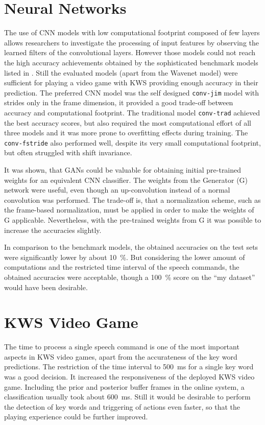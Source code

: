\section{Neural Networks}
The use of CNN models with low computational footprint composed of few layers allows researchers to investigate the processing of input features by observing the learned filters of the convolutional layers.
However those models could not reach the high accuracy achievements obtained by the sophisticated benchmark models listed in .
Still the evaluated models (apart from the Wavenet model) were sufficient for playing a video game with KWS providing enough accuracy in their prediction.
The preferred CNN model was the self designed \texttt{conv-jim} model with strides only in the frame dimension, it provided a good trade-off between accuracy and computational footprint.
The traditional model \texttt{conv-trad} achieved the best accuracy scores, but also required the most computational effort of all three models and it was more prone to overfitting effects during training.
The \texttt{conv-fstride} also performed well, despite its very small computational footprint, but often struggled with shift invariance.

It was shown, that GANs could be valuable for obtaining initial pre-trained weights for an equivalent CNN classifier.
The weights from the Generator (G) network were useful, even though an up-convolution instead of a normal convolution was performed.
The trade-off is, that a normalization scheme, such as the frame-based normalization, must be applied in order to make the weights of G applicable.
Nevertheless, with the pre-trained weights from G it was possible to increase the accuracies slightly.

In comparison to the benchmark models, the obtained accuracies on the test sets were significantly lower by about \SI{10}{\percent}.
But considering the lower amount of computations and the restricted time interval of the speech commands, the obtained accuracies were acceptable, though a \SI{100}{\percent} score on the \enquote{my dataset} would have been desirable.



\section{KWS Video Game}
The time to process a single speech command is one of the most important aspects in KWS video games, apart from the accurateness of the key word predictions.
The restriction of the time interval to \SI{500}{\milli\second} for a single key word was a good decision.
It increased the responsiveness of the deployed KWS video game.
Including the prior and posterior buffer frames in the online system, a classification usually took about \SI{600}{\milli\second}.
Still it would be desirable to perform the detection of key words and triggering of actions even faster, so that the playing experience could be further improved.

